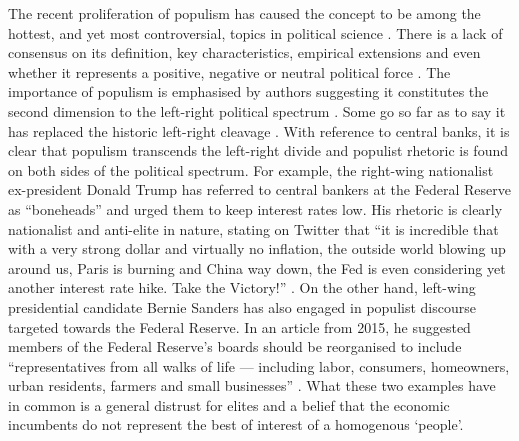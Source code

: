 \documentclass[11pt]{article}
\begin{document}
The recent proliferation of populism has caused the concept to be among the hottest, and yet most controversial, topics in political science \citep{brubaker2020populism}. There is a lack of consensus on its definition, key characteristics, empirical extensions and even whether it represents a positive, negative or neutral political force \citep{bergmann2020populism, brubaker2020populism, caiani2019understanding}. The importance of populism is emphasised by authors suggesting it constitutes the second dimension to the left-right political spectrum \citep{koch2021varieties}. Some go so far as to say it has replaced the historic left-right cleavage \citep{de2018populism}. With reference to central banks, it is clear that populism transcends the left-right divide and populist rhetoric is found on both sides of the political spectrum. For example, the right-wing nationalist ex-president Donald Trump has referred to central bankers at the Federal Reserve as ``boneheads'' and urged them to keep interest rates low. His rhetoric is clearly nationalist and anti-elite in nature, stating on Twitter that ``it is incredible that with a very strong dollar and virtually no inflation, the outside world blowing up around us, Paris is burning and China way down, the Fed is even considering yet another interest rate hike. Take the Victory!'' \cite[pg.~9]{binder2021technopopulism}. On the other hand, left-wing presidential candidate Bernie Sanders has also engaged in populist discourse targeted towards the Federal Reserve. In an article from 2015, he suggested members of the Federal Reserve's boards should be reorganised to include ``representatives from all walks of life — including labor, consumers, homeowners, urban residents, farmers and small businesses'' \citep{sanders2015bernie}. What these two examples have in common is a general distrust for elites and a belief that the economic incumbents do not represent the best of interest of a homogenous `people'.
\end{document}
